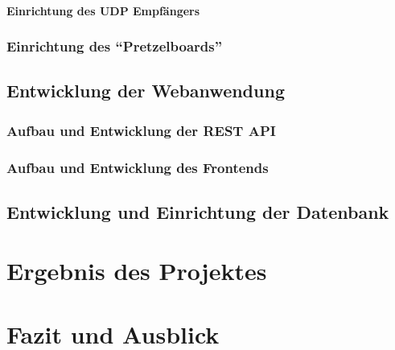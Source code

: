 \documentclass[ngerman]{scrartcl} %
\begin{document}
\paragraph{Einrichtung des UDP Empfängers}  
\label{sec:Einrichtung des UDP Empfängers-1} 

\subsubsection{Einrichtung des ``Pretzelboards''}  
\label{sec:Einrichtung des ``Pretzelboards''-1}

\subsection{Entwicklung der Webanwendung}  
\label{sec:Entwicklung der Webanwendung-1} 

\subsubsection{Aufbau und Entwicklung der REST API}  
\label{sec:Aufbau und Entwicklung der REST API-1}

\subsubsection{Aufbau und Entwicklung des Frontends}  
\label{sec:Aufbau und Entwicklung des Frontends-1}

\subsection{Entwicklung und Einrichtung der Datenbank}  
\label{sec:Entwicklung und Einrichtung der Datenbank-1} 

\newpage

\section{Ergebnis des Projektes}        
\label{sec:Ergebnis des Projektes-1}  

\newpage

\section{Fazit und Ausblick}        
\label{sec:Fazit und Ausblick-1}  

\newpage


  


\newpage


\listoffigures

 
\end{document}
